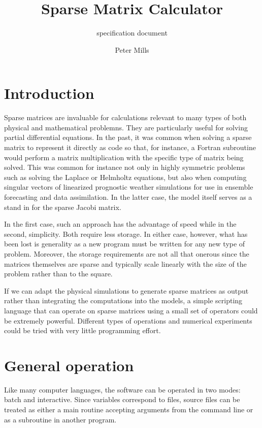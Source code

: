 \documentclass{article}
\begin{document}
\title{Sparse Matrix Calculator}

\subtitle{specification document}

\author{Peter Mills}

\maketitle

\section{Introduction}

Sparse matrices are invaluable for calculations relevant to many types of both physical and mathematical 
problemns. They are particularly useful for solving partial differential equations.
In the past, it was common when solving a sparse matrix to represent it directly
as code so that, for instance, a Fortran subroutine would perform a 
matrix multiplication with the specific type of matrix being solved.
This was common for instance not only in highly symmetric problems such as 
solving the Laplace or Helmholtz equations, but also when computing singular 
vectors of linearized prognostic weather simulations for use in ensemble forecasting and data assimilation.
In the latter case, the model itself serves as a stand in for the sparse Jacobi
matrix.

In the first case, such an approach has the advantage of speed while in the
second, simplicity. Both require less storage.
In either case, however, what has been lost is generality as a new program
must be written for any new type of problem.
Moreover, the storage requirements are not all that onerous since the matrices
themselves are sparse and typically scale linearly with the size of the problem
rather than to the square.

If we can adapt the physical simulations to generate sparse matrices
as output rather than integrating the computations into the models, 
a simple scripting language that can operate on sparse matrices using a small set
of operators could be extremely powerful.
Different types of operations and numerical experiments could be tried with
very little programming effort.

\section{General operation}

Like many computer languages, the software can be operated in two modes:
batch and interactive. Since variables correspond to files, source files can
be treated as either a main routine accepting arguments from the command
line or as a subroutine in another program.
\end{document}
